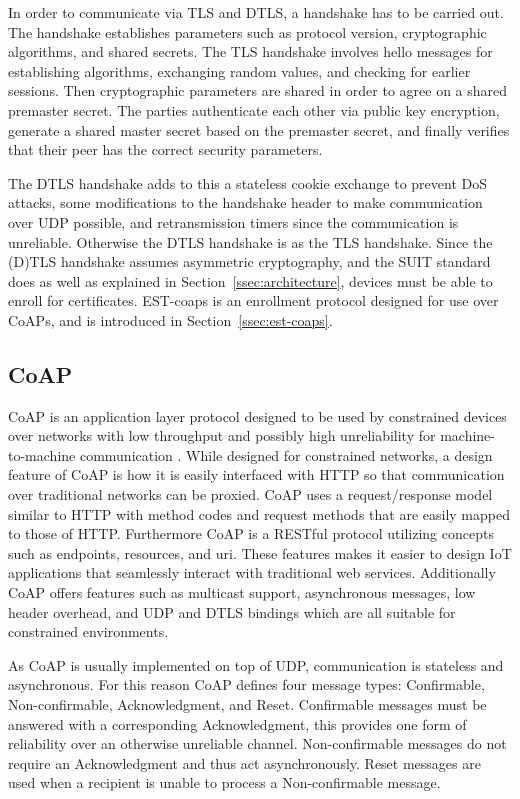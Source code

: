 \documentclass[0-thesis.tex]{subfiles}
\begin{document}
In order to communicate via TLS and DTLS, a handshake has to be carried out. The handshake
establishes parameters such as protocol version, cryptographic algorithms, and shared
secrets. The TLS handshake involves hello messages for establishing algorithms, exchanging
random values, and checking for earlier sessions. Then cryptographic parameters are shared
in order to agree on a shared premaster secret. The parties authenticate each other via
public key encryption, generate a shared master secret based on the premaster secret, and
finally verifies that their peer has the correct security parameters.

The DTLS handshake adds to this a stateless cookie exchange to prevent DoS attacks, some
modifications to the handshake header to make communication over UDP possible, and
retransmission timers since the communication is unreliable. Otherwise the DTLS handshake
is as the TLS handshake. Since the (D)TLS handshake assumes asymmetric cryptography, and
the SUIT standard does as well as explained in Section~\ref{ssec:architecture}, devices
must be able to enroll for certificates. EST-coaps is an enrollment protocol designed for
use over CoAPs, and is introduced in Section~\ref{ssec:est-coaps}.

\subsection{CoAP}
\label{ssec:coap}
CoAP is an application layer protocol designed to be used by constrained devices over
networks with low throughput and possibly high unreliability for machine-to-machine
communication \parencite{rfc7252}. While designed for constrained networks, a design
feature of CoAP is how it is easily interfaced with HTTP so that communication over
traditional networks can be proxied. CoAP uses a request/response model similar to HTTP
with method codes and request methods that are easily mapped to those of HTTP. Furthermore
CoAP is a RESTful protocol utilizing concepts such as endpoints, resources, and \gls{uri}.
These features makes it easier to design IoT applications that seamlessly interact with
traditional web services. Additionally CoAP offers features such as multicast support,
asynchronous messages, low header overhead, and UDP and DTLS bindings which are all
suitable for constrained environments.

As CoAP is usually implemented on top of UDP, communication is stateless and asynchronous.
For this reason CoAP defines four message types: Confirmable, Non-confirmable,
Acknowledgment, and Reset. Confirmable messages must be answered with a corresponding
Acknowledgment, this provides one form of reliability over an otherwise unreliable
channel. Non-confirmable messages do not require an Acknowledgment and thus act
asynchronously. Reset messages are used when a recipient is unable to process a
Non-confirmable message.
\end{document}
